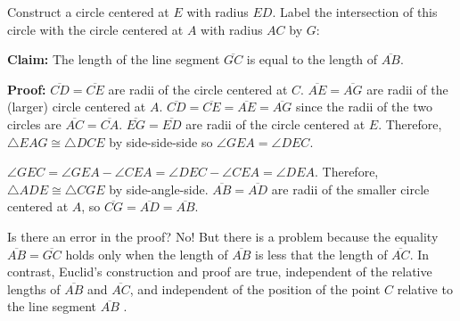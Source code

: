 Construct a circle centered at $E$ with radius $ED$. Label the intersection of this circle with the circle centered at $A$ with radius $AC$ by $G$:

\begin{center}
\end{center}

\textbf{Claim:} The length of the line segment $\overline{GC}$ is equal to the length of $\overline{AB}$.

\textbf{Proof:} $\overline{CD}=\overline{CE}$ are radii of the circle centered at $C$. $\overline{AE}=\overline{AG}$ are radii of the (larger) circle centered at $A$. $\overline{CD} = \overline{CE} = \overline{AE} = \overline{AG}$ since the radii of the two circles are $\overline{AC}= \overline{CA}$. $\overline{EG} = \overline{ED}$ are radii of the circle centered at $E$. Therefore, $\triangle EAG\cong \triangle DCE$ by side-side-side so $\angle GEA = \angle DEC$.

$\angle GEC = \angle GEA \!-\!\angle CEA = \angle DEC\!-\!\angle CEA = \angle DEA$. Therefore, $\triangle ADE\cong\triangle CGE$ by side-angle-side. $\overline{AB}=\overline{AD}$ are radii of the smaller circle centered at $A$, so $\overline{CG}=\overline{AD}=\overline{AB}$.


Is there an error in the proof? No! But there is a problem because the equality $\overline{AB}=\overline{GC}$ holds only when the length of $\overline{AB}$ is less that the length of $\overline{AC}$. In contrast, Euclid's construction and proof are true, independent of the relative lengths of  $\overline{AB}$ and $\overline{AC}$, and independent of the position of the point $C$ relative to the line segment $\overline{AB}$ \cite{toussaint}.


